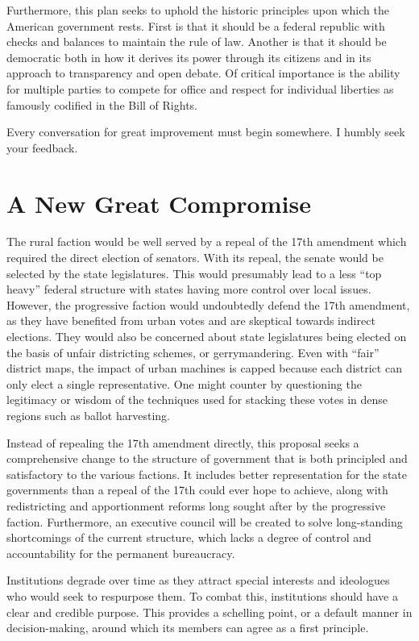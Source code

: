 \documentclass{article}
\newcommand{\quotes}[1]{``#1''}
\begin{document}
Furthermore, this plan seeks to uphold the historic principles upon which the American government rests. First is that it should be a federal republic with checks and balances to maintain the rule of law. Another is that it should be democratic both in how it derives its power through its citizens and in its approach to transparency and open debate. Of critical importance is the ability for multiple parties to compete for office and respect for individual liberties as famously codified in the Bill of Rights.

Every conversation for great improvement must begin somewhere. I humbly seek your feedback.

\section{A New Great Compromise}

The rural faction would be well served by a repeal of the 17th amendment\cite{Tucker}\cite{Virginia} which required the direct election of senators. With its repeal, the senate would be selected by the state legislatures. This would presumably lead to a less \quotes{top heavy} federal structure with states having more control over local issues. However, the progressive faction would undoubtedly defend the 17th amendment, as they have benefited from urban votes and are skeptical towards indirect elections\cite{Smith}. They would also be concerned about state legislatures being elected on the basis of unfair districting schemes, or gerrymandering. Even with \quotes{fair} district maps, the impact of urban machines is capped because each district can only elect a single representative. One might counter by questioning the legitimacy or wisdom of the techniques used for stacking these votes in dense regions such as ballot harvesting.

Instead of repealing the 17th amendment directly, this proposal seeks a comprehensive change to the structure of government that is both principled and satisfactory to the various factions. It includes better representation for the state governments than a repeal of the 17th could ever hope to achieve, along with redistricting and apportionment reforms long sought after by the progressive faction. Furthermore, an executive council will be created to solve long-standing shortcomings of the current structure, which lacks a degree of control and accountability for the permanent bureaucracy.

Institutions degrade over time as they attract special interests and ideologues who would seek to respurpose them. To combat this, institutions should have a clear and credible purpose. This provides a schelling point, or a default manner in decision-making, around which its members can agree as a first principle\cite{Komoroske}. 
\end{document}
